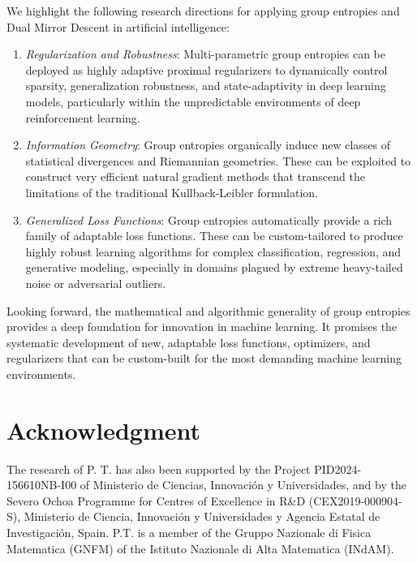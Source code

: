\documentclass[10pt]{amsart}
\theoremstyle{definition}
\theoremstyle{definition}	 %
\begin{document}
We highlight the following research directions for applying group entropies and Dual Mirror Descent in artificial intelligence:
\begin{enumerate}
\item \textit{Regularization and Robustness}: Multi-parametric group entropies can be deployed as highly adaptive proximal regularizers to dynamically control sparsity, generalization robustness, and state-adaptivity in deep learning models, particularly within the unpredictable environments of deep reinforcement learning.
\item \textit{Information Geometry}: Group entropies organically induce new classes of statistical divergences and Riemannian geometries. These can be exploited to construct very efficient natural gradient methods that transcend the limitations of the traditional Kullback-Leibler formulation.
\item \textit{Generalized Loss Functions}: Group entropies automatically provide a rich family of adaptable loss functions. These can be custom-tailored to produce highly robust learning algorithms for complex classification, regression, and generative modeling, especially in domains plagued by extreme heavy-tailed noise or adversarial outliers.
\end{enumerate}



Looking forward, the mathematical and algorithmic generality of group entropies provides a deep foundation for innovation in machine learning. It promises the systematic development of new, adaptable loss functions, optimizers, and regularizers that can be custom-built for the most demanding machine learning environments.




\section*{Acknowledgment}
The research of P. T. has also been supported by the Project PID2024-156610NB-I00 of Ministerio de Ciencias, Innovaci\'on y Universidades, and by  the Severo Ochoa Programme for Centres of Excellence in R\&D
(CEX2019-000904-S), Ministerio de Ciencia, Innovaci\'{o}n y Universidades y Agencia Estatal de Investigaci\'on, Spain.  P.T. is a member of the Gruppo Nazionale di Fisica Matematica (GNFM) of the Istituto Nazionale di Alta Matematica (INdAM).
\end{document}

